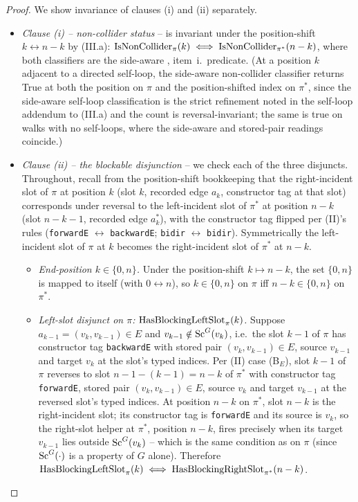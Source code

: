 \documentclass[main]{subfiles}
\begin{document}
\begin{proof}
We show invariance of clauses (i) and (ii) separately.
\begin{itemize}
    \item \emph{Clause (i) -- non-collider status} -- is invariant under the position-shift $k \leftrightarrow n - k$ by (III.a): $\mathrm{IsNonCollider}_\pi(k) \iff \mathrm{IsNonCollider}_{\pi^*}(n - k)$, where both classifiers are the side-aware , item~i.\ predicate. (At a position $k$ adjacent to a directed self-loop, the side-aware non-collider classifier returns True at both the position on $\pi$ and the position-shifted index on $\pi^*$, since the side-aware self-loop classification is the strict refinement noted in the self-loop addendum to (III.a) and the count is reversal-invariant; the same is true on walks with no self-loops, where the side-aware and stored-pair readings coincide.)
    \item \emph{Clause (ii) -- the blockable disjunction} -- we check each of the three disjuncts. Throughout, recall from the position-shift bookkeeping that the right-incident slot of $\pi$ at position $k$ (slot $k$, recorded edge $a_k$, constructor tag at that slot) corresponds under reversal to the left-incident slot of $\pi^*$ at position $n - k$ (slot $n - k - 1$, recorded edge $a_k^*$), with the constructor tag flipped per (II)'s rules (\texttt{forwardE} $\leftrightarrow$ \texttt{backwardE}; \texttt{bidir} $\leftrightarrow$ \texttt{bidir}). Symmetrically the left-incident slot of $\pi$ at $k$ becomes the right-incident slot of $\pi^*$ at $n - k$.
        \begin{itemize}
            \item \emph{End-position $k \in \{0, n\}$.} Under the position-shift $k \mapsto n - k$, the set $\{0, n\}$ is mapped to itself (with $0 \leftrightarrow n$), so $k \in \{0, n\}$ on $\pi$ iff $n - k \in \{0, n\}$ on $\pi^*$.
            \item \emph{Left-slot disjunct on $\pi$: $\mathrm{HasBlockingLeftSlot}_\pi(k)$.} Suppose $a_{k-1} = (v_k, v_{k-1}) \in E$ and $v_{k-1} \notin \mathrm{Sc}^G(v_k)$, i.e.\ the slot $k - 1$ of $\pi$ has constructor tag \texttt{backwardE} with stored pair $(v_k, v_{k-1}) \in E$, source $v_{k-1}$ and target $v_k$ at the slot's typed indices. Per (II) case (B$_E$), slot $k - 1$ of $\pi$ reverses to slot $n - 1 - (k - 1) = n - k$ of $\pi^*$ with constructor tag \texttt{forwardE}, stored pair $(v_k, v_{k-1}) \in E$, source $v_k$ and target $v_{k-1}$ at the reversed slot's typed indices. At position $n - k$ on $\pi^*$, slot $n - k$ is the right-incident slot; its constructor tag is \texttt{forwardE} and its source is $v_k$, so the right-slot helper at $\pi^*$, position $n - k$, fires precisely when its target $v_{k-1}$ lies outside $\mathrm{Sc}^G(v_k)$ -- which is the same condition as on $\pi$ (since $\mathrm{Sc}^G(\cdot)$ is a property of $G$ alone). Therefore $\mathrm{HasBlockingLeftSlot}_\pi(k) \iff \mathrm{HasBlockingRightSlot}_{\pi^*}(n - k)$.

\end{itemize}
\end{itemize}
\end{proof}
\end{document}
